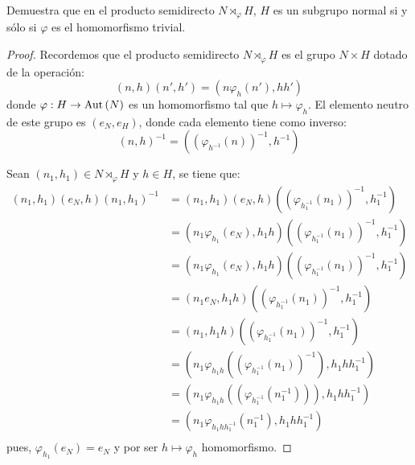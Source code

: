 \documentclass[12pt]{report}
\newcounter{it}
\theoremstyle{largebreak}
\newcommand\cf[3]{\ensuremath{#1:#2\rightarrow#3}}
\newcommand{\Aut}[1]{\ensuremath{\textup{Aut}\left(#1\right)}}
\begin{document}
    \begin{excer}
        Demuestra que en el producto semidirecto $N\rtimes_{\varphi}H$, $H$ es un subgrupo normal si y sólo si $\varphi$ es el homomorfismo trivial.
    \end{excer}

    \begin{proof}
        Recordemos que el producto semidirecto $N\rtimes_\varphi H$ es el grupo $N\times H$ dotado de la operación:
        \begin{equation*}
            (n,h)(n',h')=(n\varphi_h(n'),hh')
        \end{equation*}
        donde $\cf{\varphi}{H}{\Aut{N}}$ es un homomorfismo tal que $h\mapsto\varphi_h$. El elemento neutro de este grupo es $(e_N,e_H)$, donde cada elemento tiene como inverso:
        \begin{equation*}
            (n,h)^{-1}=\left((\varphi_{h^{-1}}(n))^{-1},h^{-1}\right)
        \end{equation*}

        Sean $(n_1,h_1)\in N\rtimes_{\varphi}H$ y $h\in H$, se tiene que:
        \begin{equation*}
            \begin{split}
                (n_1,h_1)(e_N,h)(n_1,h_1)^{-1}&=(n_1,h_1)(e_N,h)\left((\varphi_{h_1^{-1}}(n_1))^{-1},h_1^{-1}\right)\\
                &=(n_1\varphi_{h_1}(e_N),h_1h)\left((\varphi_{h_1^{-1}}(n_1))^{-1},h_1^{-1}\right)\\
                &=(n_1\varphi_{h_1}(e_N),h_1h)\left((\varphi_{h_1^{-1}}(n_1))^{-1},h_1^{-1}\right)\\
                &=(n_1e_N,h_1h)\left((\varphi_{h_1^{-1}}(n_1))^{-1},h_1^{-1}\right)\\
                &=(n_1,h_1h)\left((\varphi_{h_1^{-1}}(n_1))^{-1},h_1^{-1}\right)\\
                &=\left(n_1\varphi_{h_1h}\left((\varphi_{h_1^{-1}}(n_1))^{-1}\right),h_1hh_1^{-1} \right)\\
                &=\left(n_1\varphi_{h_1h}\left((\varphi_{h_1^{-1}}(n_1^{-1}))\right),h_1hh_1^{-1} \right)\\
                &=\left(n_1\varphi_{h_1h h_1^{-1}}\left(n_1^{-1}\right),h_1hh_1^{-1} \right)\\
            \end{split}
        \end{equation*}
        pues, $\varphi_{h_1}(e_N)=e_N$ y por ser $h\mapsto\varphi_h$ homomorfismo.


\end{proof}
\end{document}
